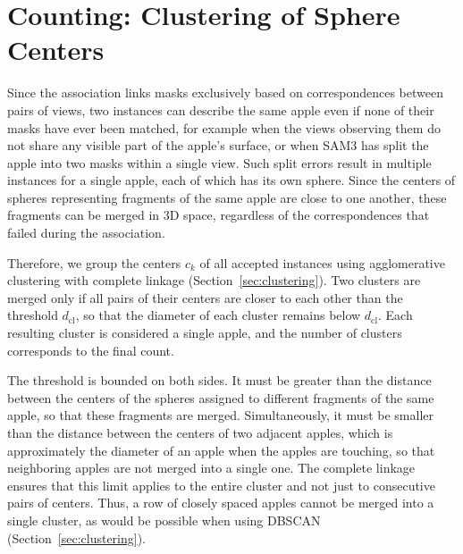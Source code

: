 \documentclass[english, egger, bsc]{vcethesis}
\begin{document}
\section{Counting: Clustering of Sphere Centers}
\label{sec:method_clustering}
Since the association links masks exclusively based on correspondences between pairs of views, two instances can describe the same apple even if none of their masks have ever been matched, for example when the views observing them do not share any visible part of the apple's surface, or when SAM3 has split the apple into two masks within a single view. Such split errors result in multiple instances for a single apple, each of which has its own sphere. Since the centers of spheres representing fragments of the same apple are close to one another, these fragments can be merged in 3D space, regardless of the correspondences that failed during the association.

Therefore, we group the centers $c_k$ of all accepted instances using agglomerative clustering with complete linkage (Section~\ref{sec:clustering}). Two clusters are merged only if all pairs of their centers are closer to each other than the threshold $d_{\mathrm{cl}}$, so that the diameter of each cluster remains below $d_{\mathrm{cl}}$. Each resulting cluster is considered a single apple, and the number of clusters corresponds to the final count.

The threshold is bounded on both sides. It must be greater than the distance between the centers of the spheres assigned to different fragments of the same apple, so that these fragments are merged. Simultaneously, it must be smaller than the distance between the centers of two adjacent apples, which is approximately the diameter of an apple when the apples are touching, so that neighboring apples are not merged into a single one. The complete linkage ensures that this limit applies to the entire cluster and not just to consecutive pairs of centers. Thus, a row of closely spaced apples cannot be merged into a single cluster, as would be possible when using DBSCAN (Section~\ref{sec:clustering}). 
\end{document}
